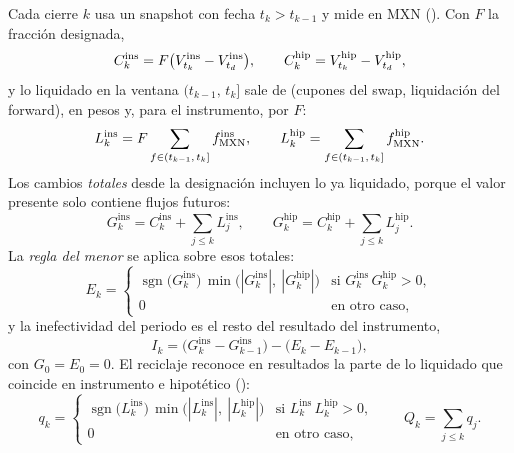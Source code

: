 Cada cierre $k$ usa un snapshot con fecha $t_k>t_{k-1}$ y mide en MXN
(). Con $F$ la fracción designada,
\begin{equation}\label{eq:cap10-acumulados}
  C^{\mathrm{ins}}_k = F\bigl(V^{\mathrm{ins}}_{t_k} - V^{\mathrm{ins}}_{t_d}\bigr), \qquad
  C^{\mathrm{hip}}_k = V^{\mathrm{hip}}_{t_k} - V^{\mathrm{hip}}_{t_d},
\end{equation}
y lo liquidado en la ventana $(t_{k-1},\,t_k]$ sale de  (cupones del swap,
liquidación del forward), en pesos y, para el instrumento, por $F$:
\begin{equation}\label{eq:cap10-liquidado}
  L^{\mathrm{ins}}_k = F\sum_{f\in(t_{k-1},\,t_k]} f^{\mathrm{ins}}_{\textup{MXN}}, \qquad
  L^{\mathrm{hip}}_k = \sum_{f\in(t_{k-1},\,t_k]} f^{\mathrm{hip}}_{\textup{MXN}}.
\end{equation}
Los cambios \emph{totales} desde la designación incluyen lo ya liquidado, porque el valor presente solo contiene flujos
futuros:
\begin{equation}\label{eq:cap10-totales}
  G^{\mathrm{ins}}_k = C^{\mathrm{ins}}_k + \sum_{j\le k} L^{\mathrm{ins}}_j, \qquad
  G^{\mathrm{hip}}_k = C^{\mathrm{hip}}_k + \sum_{j\le k} L^{\mathrm{hip}}_j.
\end{equation}
La \emph{regla del menor} se aplica sobre esos totales:
\begin{equation}\label{eq:cap10-menor}
  E_k =
  \begin{cases}
    \operatorname{sgn}\!\bigl(G^{\mathrm{ins}}_k\bigr)\,\min\!\bigl(|G^{\mathrm{ins}}_k|,\ |G^{\mathrm{hip}}_k|\bigr)
      & \text{si } G^{\mathrm{ins}}_k\,G^{\mathrm{hip}}_k > 0,\\[2pt]
    0 & \text{en otro caso,}
  \end{cases}
\end{equation}
y la inefectividad del periodo es el resto del resultado del instrumento,
\begin{equation}\label{eq:cap10-inefectividad}
  I_k = \bigl(G^{\mathrm{ins}}_k - G^{\mathrm{ins}}_{k-1}\bigr) - \bigl(E_k - E_{k-1}\bigr),
\end{equation}
con $G_0 = E_0 = 0$. El reciclaje reconoce en resultados la parte de lo liquidado que coincide en instrumento e hipotético
():
\begin{equation}\label{eq:cap10-coincide}
  q_k =
  \begin{cases}
    \operatorname{sgn}\!\bigl(L^{\mathrm{ins}}_k\bigr)\,\min\!\bigl(|L^{\mathrm{ins}}_k|,\ |L^{\mathrm{hip}}_k|\bigr)
      & \text{si } L^{\mathrm{ins}}_k\,L^{\mathrm{hip}}_k > 0,\\[2pt]
    0 & \text{en otro caso,}
  \end{cases}
  \qquad Q_k = \sum_{j\le k} q_j .
\end{equation}
